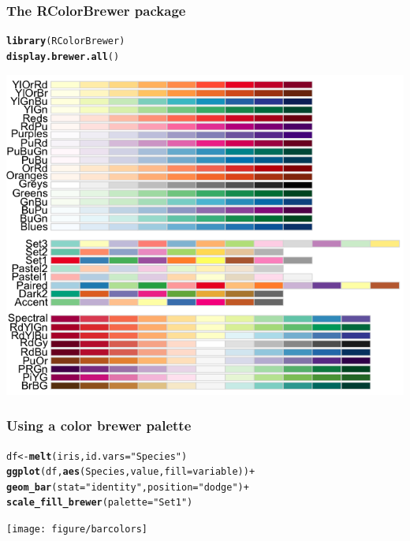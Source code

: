 \documentclass{beamer}\usepackage[]{graphicx}\usepackage[]{color}
\makeatletter
\newcommand{\hlstr}[1]{\textcolor[rgb]{0.192,0.494,0.8}{#1}}%
\newcommand{\hlkwd}[1]{\textcolor[rgb]{0.737,0.353,0.396}{\textbf{#1}}}%
\newenvironment{kframe}{%
 \def\at@end@of@kframe{}%
 \ifinner\ifhmode%
  \def\at@end@of@kframe{\end{minipage}}%
  \begin{minipage}{\columnwidth}%
 \fi\fi%
 \def\FrameCommand##1{\hskip\@totalleftmargin \hskip-\fboxsep
 \colorbox{shadecolor}{##1}\hskip-\fboxsep
     \hskip-\linewidth \hskip-\@totalleftmargin \hskip\columnwidth}%
 \MakeFramed {\advance\hsize-\width
   \@totalleftmargin\z@ \linewidth\hsize
   \@setminipage}}%
 {\par\unskip\endMakeFramed%
 \at@end@of@kframe}
\newenvironment{knitrout}{}{} %
\makeatother
\begin{document}

\begin{frame}[fragile]
\frametitle{The RColorBrewer package}
\begin{knitrout}\footnotesize
{}\color{fgcolor}\begin{kframe}
\begin{alltt}
\hlkwd{library}(RColorBrewer)
\hlkwd{display.brewer.all}()
\end{alltt}
\end{kframe}
\end{knitrout}

\begin{center}
\includegraphics[scale=0.25]{images/color_palette.png}
\end{center}
\end{frame}


\begin{frame}[fragile]
\frametitle{Using a color brewer palette}
\begin{knitrout}\footnotesize
{}\color{fgcolor}\begin{kframe}
\begin{alltt}
df  <- \hlkwd{melt}(iris, id.vars = \hlstr{"Species"})
\hlkwd{ggplot}(df, \hlkwd{aes}(Species, value, fill = variable)) +
\hlkwd{geom_bar}(stat = \hlstr{"identity"}, position = \hlstr{"dodge"}) +
\hlkwd{scale_fill_brewer}(palette = \hlstr{"Set1"})
\end{alltt}
\end{kframe}

{\centering \texttt{[image: figure/barcolors]} 

}



\end{knitrout}

\end{frame}
\end{document}
